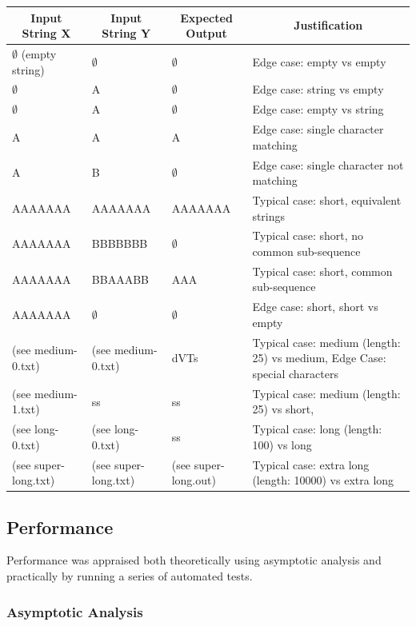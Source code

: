 \begin{center}
\begin{tabular}{ | p{4cm} | p{4cm}| p{2cm} | p{4cm} | } 
\hline
\multicolumn{1}{|c|}{Input String X} & \multicolumn{1}{c|}{Input String Y} & \multicolumn{1}{c|}{Expected Output} & \multicolumn{1}{c|}{Justification} \\
\hline
$\emptyset$ (empty string) & $\emptyset$ & $\emptyset$ & Edge case: empty vs empty \\ 
\hline
$\emptyset$ & A & $\emptyset$ & Edge case: string vs empty \\ 
\hline
$\emptyset$ & A & $\emptyset$ & Edge case: empty vs string \\ 
\hline
A & A & A & Edge case: single character matching \\ 
\hline
A & B & $\emptyset$ & Edge case: single character not matching \\ 
\hline
AAAAAAA & AAAAAAA & AAAAAAA & Typical case: short, equivalent strings \\
\hline
AAAAAAA & BBBBBBB & $\emptyset$ & Typical case: short, no common sub-sequence \\
\hline
AAAAAAA & BBAAABB & AAA & Typical case: short, common sub-sequence \\
\hline
AAAAAAA & $\emptyset$ & $\emptyset$ & Edge case: short, short vs empty \\
\hline
(see medium-0.txt) & (see medium-0.txt) & dVTs & Typical case: medium (length: 25) vs medium, Edge Case: special characters \\
\hline
(see medium-1.txt) & ss & ss & Typical case: medium (length: 25) vs short,  \\
\hline
(see long-0.txt) & (see long-0.txt) & ss & Typical case: long (length: 100) vs long \\
\hline
(see super-long.txt) & (see super-long.txt) & (see super-long.out) & Typical case: extra long (length: 10000) vs extra long \\
\hline
\end{tabular}
\end{center}


\subsection{Performance}
Performance was appraised both theoretically using asymptotic analysis and practically by running a series of automated tests.

\subsubsection{Asymptotic Analysis}

